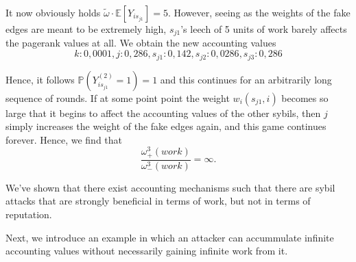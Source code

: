 \begin{example}[]
\noindent{}It now obviously holds $\tilde{\omega}\cdot{}\mathbb{E}[Y_{is_{j1}}]=5$. However, seeing as the weights of the fake edges are meant to be extremely high, $s_{j1}$'s leech of 5 units of work barely affects the pagerank values at all. We obtain the new accounting values
\[
k:0,0001, j:0,286, s_{j1}:0,142, s_{j2}:0,0286, s_{j3}:0,286
\]

\noindent{}Hence, it follows $\mathbb{P}(Y^{(2)}_{is_{j1}}=1)=1$ and this continues for an arbitrarily long sequence of rounds. If at some point point the weight $w_i(s_{j1},i)$ becomes so large that it begins to affect the accounting values of the other sybils, then $j$ simply increases the weight of the fake edges again, and this game continues forever. Hence, we find that 
\[
\frac{\omega^3_{+}(work)}{\omega^3_{-}(work)}=\infty.
\]

\noindent{}We've shown that there exist accounting mechanisms such that there are sybil attacks that are strongly beneficial in terms of work, but not in terms of reputation. 
\end{example}


\begin{comment}
\noindent{}The effectiveness of this attack is limited to node $i$, which is certainly problematic for a P2P network, but not as much as a sybil attack, through which the attacker could leech arbitrary amounts from several nodes (possibly even a significant proportion of the network). In fact, the upper example may not even qualify as a proper sybil attack. Instead this type of attack is often also referred to as an {\it Eclipse Attack}. Note that a strongly beneficial eclipse attack is not nearly as severe as a strongly beneficial sybil attack. In fact, a strongly beneficial eclipse attack may be less problematic than some types of weakly beneficial sybil attacks. This prompts us to introduce a new definition.\vspace{1em}\\
\end{comment}

\noindent{}Next, we introduce an example in which an attacker can accummulate infinite accounting values without necessarily gaining infinite work from it.

